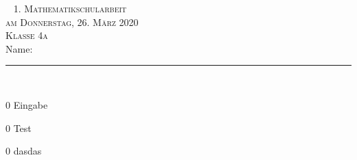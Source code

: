 \documentclass[a4paper,12pt]{report}
\begin{document}
\begin{titlepage}
\flushright
~\vfil 
\textsc{\Huge 1. Mathematikschularbeit} \\ 
[2cm] 
\textsc{\Large am Donnerstag, 26. März 2020}\\ [1cm] 
\textsc{\Large Klasse 4a} \\ [1cm] 
\Large Name: \rule{8cm}{0.4pt} \\ 
\vfil\vfil\vfil 
\end{titlepage}

\begin{langesbeispiel} \item[0]
Eingabe

\end{langesbeispiel}

\begin{langesbeispiel} \item[0]
Test

\end{langesbeispiel}

\begin{langesbeispiel} \item[0]
dasdas

\end{langesbeispiel}



\end{document}
